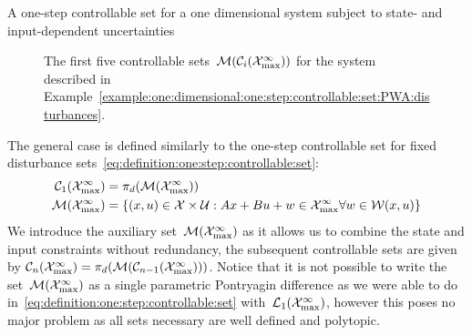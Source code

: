 \begin{example}{A one-step controllable set for a one dimensional system subject to state- and input-dependent uncertainties}
\begin{figure}
\centering
{}
\caption[Controllable Sets~$\mathcal M(\C_i(\X^\infty_{\max}))$ for PWA disturbance]{The first five controllable sets~$\mathcal M(\C_i(\X^\infty_{\max}))$ for the system described in Example~\ref{example:one:dimensional:one:step:controllable:set:PWA:disturbances}.}
\label{fig:example:first:five:controllable:Sets}
\end{figure}

\end{example}
%
The general case is defined similarly to the one-step controllable set for fixed disturbance sets~\eqref{eq:definition:one:step:controllable:set}:
%
\begin{equation}\begin{aligned}
	\mathcal C_1(\mathcal X_{\max}^\infty) &= \pi_d(\mathcal M(\mathcal X^\infty_{\max}))\\
	\mathcal M(\mathcal X^\infty_{\max})&=\{(x,u)\in\mathcal X\times\mathcal U:Ax+Bu+w\in\mathcal {\mathcal X}_{\max}^\infty\forall w\in\mathcal W(x,u)\}
\end{aligned}\end{equation}
%
We introduce the auxiliary set~$\mathcal M(\mathcal X^\infty_{\max})$ as it allows us to combine the state and input constraints without redundancy,
the subsequent controllable sets are given by $\mathcal C_n(\mathcal X_{\max}^\infty) = \pi_d(\mathcal M(\mathcal C_{n-1}(\mathcal X^\infty_{\max})))$.
%
Notice that it is not possible to write the set~$\mathcal M(\mathcal X_{\max}^\infty)$ as a single parametric Pontryagin difference as we were able to do in~\eqref{eq:definition:one:step:controllable:set} with~$\mathcal L_1(\mathcal X^\infty_{\max})$, however this poses no major problem as all sets necessary are well defined and polytopic.

